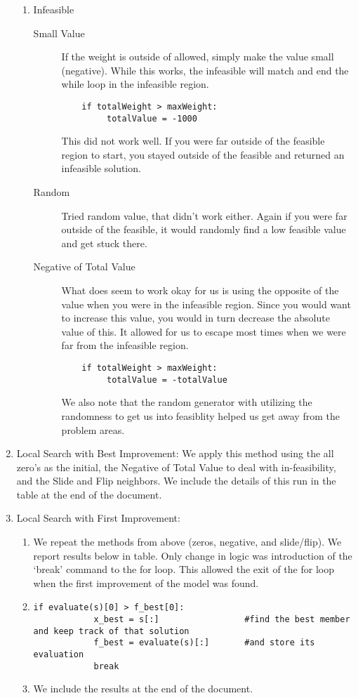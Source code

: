 \documentclass[11pt]{article}
\begin{document}
\begin{enumerate}
\begin{enumerate}
\item Infeasible
\begin{description}
\item [Small Value]  If the weight is outside of allowed, simply make the value small (negative). While this works, the infeasible will match and end the while loop in the infeasible region.
\begin{verbatim}
    if totalWeight > maxWeight:
         totalValue = -1000
\end{verbatim}
This did not work well.  If you were far outside of the feasible region to start, you stayed outside of the feasible and returned an infeasible solution.  
\item [Random] Tried random value, that didn't work either.  Again if you were far outside of the feasible, it would randomly find a low feasible value and get stuck there.  
\item [Negative of Total Value]    What does seem to work okay for us is using the opposite of the value when you were in the infeasible region.  Since you would want to increase this value, you would in turn decrease the absolute value of this.  It allowed for us to escape most times when we were far from the infeasible region.
\begin{verbatim}
    if totalWeight > maxWeight:
         totalValue = -totalValue
\end{verbatim}
We also note that the random generator with utilizing the randomness to get us into feasiblity helped us get away from the problem areas.
\end{description}
\end{enumerate}
\item Local Search with Best Improvement:  We apply this method using the all zero's as the initial, the Negative of Total Value to deal with in-feasibility, and the Slide and Flip neighbors.
We include the details of this run in the table at the end of the document.

\item Local Search with First Improvement:  
\begin{enumerate}
\item We repeat the methods from above (zeros, negative, and slide/flip).  We report results below in table.  Only change in logic was introduction of the `break' command to the for loop.  This allowed the exit of the for loop when the first improvement of the model was found. 

\item 
\begin{verbatim}
if evaluate(s)[0] > f_best[0]:
            x_best = s[:]                 #find the best member and keep track of that solution
            f_best = evaluate(s)[:]       #and store its evaluation
            break
\end{verbatim}
 \item We include the results at the end of the document.
\end{enumerate}


\end{enumerate}
\end{document}
